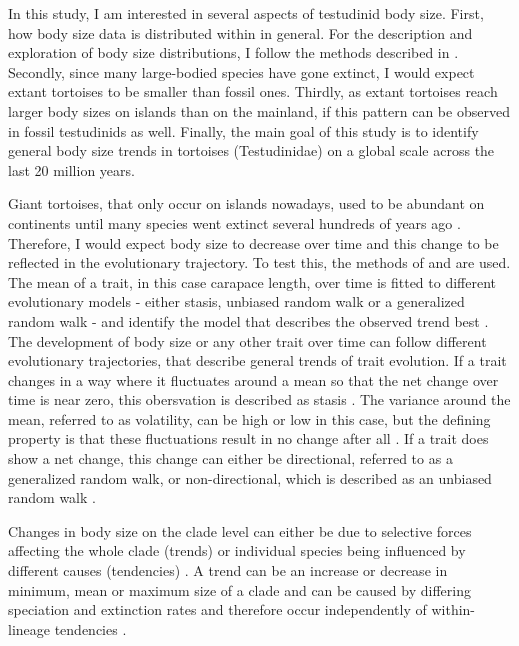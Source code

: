 In this study, I am interested in several aspects of testudinid body size.
First, how  body size data is distributed within \T in general. For the description and exploration of body size distributions, I follow the methods described in \cite{Lyons2008}.
Secondly, since many large-bodied species have gone extinct, I would expect extant tortoises to be smaller than fossil ones. Thirdly, as extant tortoises reach larger body sizes on islands than on the mainland, if this pattern can be observed in fossil testudinids as well.
Finally, the main goal of this study is to identify general body size trends in tortoises (Testudinidae) on a global scale across the last 20 million years. 

Giant tortoises, that only occur on islands nowadays, used to be abundant on continents until many species went extinct several hundreds of years ago \citep{Rhodin2015,Pritchard2013}. 
Therefore, I would expect body size to decrease over time and this change to be reflected in the evolutionary trajectory. 
To test this, the methods of \cite{Hunt2006,Hunt2008} and \cite{Hunt2010} are used. The mean of a trait, in this case carapace length, over time is fitted to different evolutionary models - either stasis, unbiased random walk or a generalized random walk - and identify the model that describes the observed trend best \citep{Hunt2010}.
The development of body size or any other trait over time can follow different evolutionary trajectories, that describe general trends of trait evolution. If a trait changes in a way where it fluctuates around a mean so that the net change over time is near zero, this obersvation is described as stasis \citep{Hunt2006}. The variance around the mean, referred to as volatility, can be high or low in this case, but the defining property is that these fluctuations result in no change after all \citep{Hunt2006}.
If a trait does show a net change, this change can either be directional, referred to as a generalized random walk, or non-directional, which is described as an unbiased random walk \citep{Hunt2004,Hunt2015}.

Changes in body size on the clade level can either be due to selective forces affecting the whole clade (trends) or individual species being influenced by different causes (tendencies) \citep{Hunt2006}. A trend can be an increase or decrease in minimum, mean or maximum size of a clade and can be caused by differing speciation and extinction rates and therefore occur independently of within-lineage tendencies \citep{Smith2016}.


